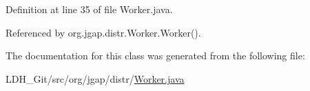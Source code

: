 Definition at line 35 of file Worker.\-java.



Referenced by org.\-jgap.\-distr.\-Worker.\-Worker().



The documentation for this class was generated from the following file\-:\begin{DoxyCompactItemize}
\item 
L\-D\-H\-\_\-\-Git/src/org/jgap/distr/\hyperlink{_worker_8java}{Worker.\-java}\end{DoxyCompactItemize}
